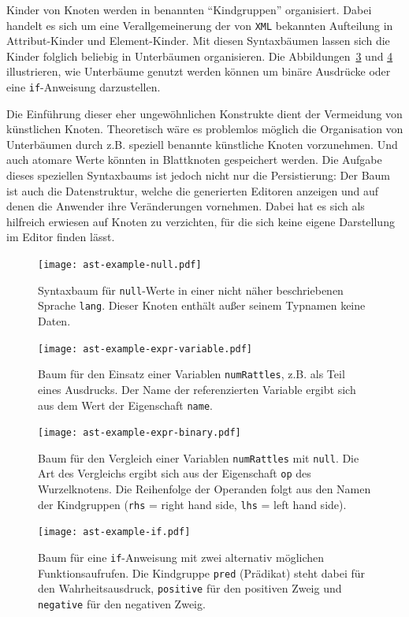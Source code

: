 \documentclass[paper=a4,fontsize=11pt,parskip=half]{scrartcl}
\begin{document}
Kinder von Knoten werden in benannten \enquote{Kindgruppen} organisiert. Dabei handelt es sich um eine Verallgemeinerung der von \texttt{XML} bekannten Aufteilung in Attribut-Kinder und Element-Kinder. Mit diesen Syntaxbäumen lassen sich die Kinder folglich beliebig in Unterbäumen organisieren. Die Abbildungen~\ref{fig:ast-example-binary} und \ref{fig:ast-example-if} illustrieren, wie Unterbäume genutzt werden können um binäre Ausdrücke oder eine \texttt{if}-Anweisung darzustellen.

Die Einführung dieser eher ungewöhnlichen Konstrukte dient der Vermeidung von künstlichen Knoten. Theoretisch wäre es problemlos möglich die Organisation von Unterbäumen durch z.B. speziell benannte künstliche Knoten vorzunehmen. Und auch atomare Werte könnten in Blattknoten gespeichert werden. Die Aufgabe dieses speziellen Syntaxbaums ist jedoch nicht nur die Persistierung: Der Baum ist auch die Datenstruktur, welche die generierten Editoren anzeigen und auf denen die Anwender ihre Veränderungen vornehmen. Dabei hat es sich als hilfreich erwiesen auf Knoten zu verzichten, für die sich keine eigene Darstellung im Editor finden lässt.

\begin{figure}[p]
  \centering\texttt{[image: ast-example-null.pdf]}
  \caption{Syntaxbaum für \texttt{null}-Werte in einer nicht näher beschriebenen Sprache \texttt{lang}. Dieser Knoten enthält außer seinem Typnamen keine Daten.}
  \label{fig:ast-example-null}
\end{figure}

\begin{figure}[p]
  \centering\texttt{[image: ast-example-expr-variable.pdf]}
  \caption{Baum für den Einsatz einer Variablen \texttt{numRattles}, z.B. als Teil eines Ausdrucks. Der Name der referenzierten Variable ergibt sich aus dem Wert der Eigenschaft \texttt{name}.}
  \label{fig:ast-example-variable}
\end{figure}

\begin{figure}[p]
  \centering\texttt{[image: ast-example-expr-binary.pdf]}
  \caption{Baum für den Vergleich einer Variablen \texttt{numRattles} mit \texttt{null}. Die Art des Vergleichs ergibt sich aus der Eigenschaft \texttt{op} des Wurzelknotens. Die Reihenfolge der Operanden folgt aus den Namen der Kindgruppen (\texttt{rhs} = right hand side, \texttt{lhs} = left hand side).}
  \label{fig:ast-example-binary}
\end{figure}

\begin{figure}[p]
  \centering\texttt{[image: ast-example-if.pdf]}
  \caption{Baum für eine \texttt{if}-Anweisung mit zwei alternativ möglichen Funktionsaufrufen. Die Kindgruppe \texttt{pred} (Prädikat) steht dabei für den Wahrheitsausdruck, \texttt{positive} für den positiven Zweig und \texttt{negative} für den negativen Zweig.}
  \label{fig:ast-example-if}
\end{figure}
\end{document}
